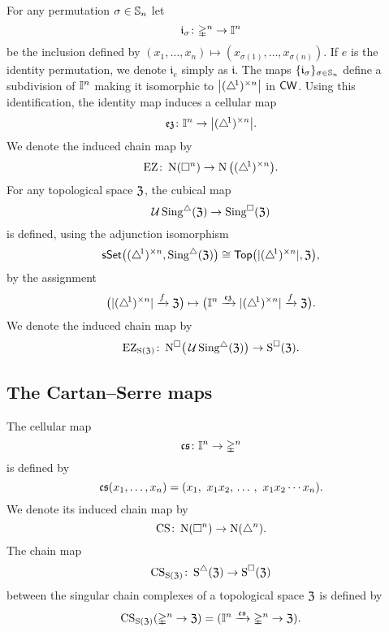 For any permutation $\sigma \in \sym_n$ let
\[
\gi_\sigma \colon \gsimplex^n \to \gcube^n
\]
be the inclusion defined by $(x_1, \dots, x_n) \mapsto (x_{\sigma(1)}, \dots, x_{\sigma(n)})$.
If $e$ is the identity permutation, we denote $\mathfrak{i}_{e}$ simply as $\mathfrak{i}$.
The maps $\set{\mathfrak{i}_\sigma}_{\sigma \in \sym_n}$ define a subdivision of $\gcube^n$ making it isomorphic to $\bars[\big]{\scube{n}}$ in $\CW$.
Using this identification, the identity map induces a cellular map
\[
\ez \colon \gcube^n \to \bars[\big]{\scube{n}}.
\]
We denote the induced chain map by
\[
\EZ \colon \chains(\cube^n) \to \chains\big(\scube{n}\big).
\]
For any topological space $\fZ$, the cubical map
\[
\cubify\sSing(\fZ) \to \cSing(\fZ)
\]
is defined, using the adjunction isomorphism
\[
\sSet\big(\scube{n}, \sSing(\fZ)\big) \cong
\Top\big(\bars{\scube{n}}, \fZ\big),
\]
by the assignment
\[
\big( \bars{\scube{n}} \xra{f} \fZ \big) \mapsto
\big( \gcube^n \xra{\ez} \bars{\scube{n}} \xra{f} \fZ \big).
\]
We denote the induced chain map by
\[
\EZ_{\Schains(\fZ)} \colon
\cchains\!\big(\cubify\sSing(\fZ)\big) \to \cSchains(\fZ).
\]



\subsection{The Cartan--Serre maps}

The cellular map
\[
\cs \colon \gcube^n \to \gsimplex^n
\]
is defined by
\[
\cs(x_1, \dots, x_n) =
(x_1,\ x_1 x_2, \, \dots \, , \ x_1 x_2 \dotsm x_n).
\]
We denote its induced chain map by
\[
\CS \colon \chains(\cube^n) \to \chains(\simplex^n).
\]
The chain map
\[
\CS_{\Schains(\fZ)} \colon \sSchains(\fZ) \to \cSchains(\fZ)
\]
between the singular chain complexes of a topological space $\fZ$ is defined by
\[
\CS_{\Schains(\fZ)} (\gsimplex^n \to \fZ) =
(\gcube^n \xra{\cs} \gsimplex^n \to \fZ).
\]


